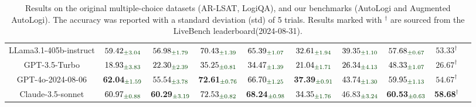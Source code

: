 \begin{table*}[!ht]
{\begin{tabular}{cccccccccc}
LLama3.1-405b-instruct & $\text{59.42}_{\textcolor{deepgreen}{\pm\text{3.04}}}$ & $\text{56.98}_{\textcolor{deepgreen}{\pm\text{1.79}}}$ & $\text{70.43}_{\textcolor{deepgreen}{\pm\text{1.39}}}$ & $\text{65.39}_{\textcolor{deepgreen}{\pm\text{1.07}}}$ & $\text{32.61}_{\textcolor{deepgreen}{\pm\text{1.94}}}$ & $\text{39.35}_{\textcolor{deepgreen}{\pm\text{1.10}}}$ & $\text{57.68}_{\textcolor{deepgreen}{\pm\text{0.67}}}$ & $\text{53.33}^{\dagger}$ \\
GPT-3.5-Turbo & $\text{18.93}_{\textcolor{deepgreen}{\pm\text{3.83}}}$ & $\text{22.30}_{\textcolor{deepgreen}{\pm\text{2.39}}}$ & $\text{35.25}_{\textcolor{deepgreen}{\pm\text{0.81}}}$ & $\text{34.47}_{\textcolor{deepgreen}{\pm\text{1.39}}}$ & $\text{21.04}_{\textcolor{deepgreen}{\pm\text{1.71}}}$ & $\text{26.34}_{\textcolor{deepgreen}{\pm\text{4.13}}}$ & $\text{48.33}_{\textcolor{deepgreen}{\pm\text{1.07}}}$ & $\text{26.67}^{\dagger}$ \\
GPT-4o-2024-08-06 & \textbf{62.04}$_{\textcolor{deepgreen}{\pm\text{1.59}}}$ & $\text{55.54}_{\textcolor{deepgreen}{\pm\text{3.78}}}$ & \textbf{72.61}$_{\textcolor{deepgreen}{\pm\text{0.76}}}$ & $\text{66.70}_{\textcolor{deepgreen}{\pm\text{1.25}}}$ & \textbf{37.39}$_{\textcolor{deepgreen}{\pm\text{0.91}}}$ & $\text{43.74}_{\textcolor{deepgreen}{\pm\text{1.30}}}$ & $\text{59.95}_{\textcolor{deepgreen}{\pm\text{1.13}}}$ & $\text{54.67}^{\dagger}$ \\
Claude-3.5-sonnet & $\text{60.97}_{\textcolor{deepgreen}{\pm\text{0.88}}}$ & \textbf{60.29}$_{\textcolor{deepgreen}{\pm\text{3.19}}}$ & $\text{72.53}_{\textcolor{deepgreen}{\pm\text{0.82}}}$ & \textbf{68.24}$_{\textcolor{deepgreen}{\pm\text{0.98}}}$ & $\text{34.35}_{\textcolor{deepgreen}{\pm\text{1.76}}}$ & 46.83$_{\textcolor{deepgreen}{\pm\text{3.24}}}$ & \textbf{60.53}$_{\textcolor{deepgreen}{\pm\text{0.63}}}$ & \textbf{58.68}$^{\dagger}$ \\ \bottomrule
\end{tabular}
}
\caption{Results on the original multiple-choice datasets (AR-LSAT, LogiQA), and our benchmarks (AutoLogi and Augmented AutoLogi). The accuracy was reported with a standard deviation (std) of 5 trials. Results marked with $^{\dagger}$ are sourced from the LiveBench leaderboard(2024-08-31).
}
\label{table_main}
\end{table*}




